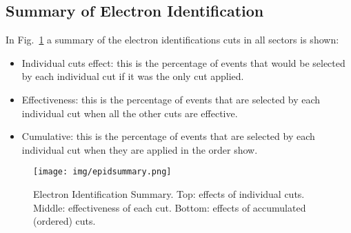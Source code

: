 \clearpage\newpage

\subsection{Summary of Electron Identification }
In Fig.~\ref{fig:epidsummary} a summary of the electron identifications cuts in all sectors is shown:

\begin{itemize}
	\item Individual cuts effect: this is the percentage of events that would be selected by each
	individual cut if it was the only cut applied.
	\item Effectiveness: this is the percentage of events that are selected by each individual cut when
	all the other cuts are effective.
	\item Cumulative: this is the percentage of events that are selected by each individual cut when
	they are applied in the order show.
\end{itemize}


\begin{figure}[hb]
  \centering
		\texttt{[image: img/epidsummary.png]}
		\caption{Electron Identification Summary. Top: effects of individual cuts.
		         Middle: effectiveness of each cut.
               Bottom: effects of accumulated (ordered) cuts.}
 		\label{fig:epidsummary}
\end{figure}













